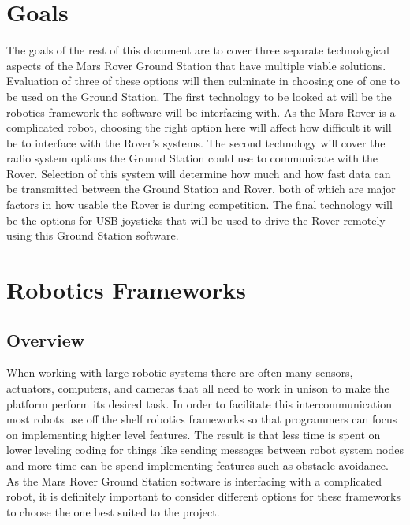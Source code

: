 \documentclass[onecolumn, draftclsnofoot, 10pt, compsoc]{IEEEtran}
\begin{document}
\section{Goals}
The goals of the rest of this document are to cover three separate technological aspects of the Mars Rover Ground Station that have multiple viable solutions. Evaluation of three of these options will then culminate in choosing one of one to be used on the Ground Station.
The first technology to be looked at will be the robotics framework the software will be interfacing with. As the Mars Rover is a complicated robot, choosing the right option here will affect how difficult it will be to interface with the Rover's systems.
The second technology will cover the radio system options the Ground Station could use to communicate with the Rover. Selection of this system will determine how much and how fast data can be transmitted between the Ground Station and Rover, both of which are major factors in how usable the Rover is during competition.
The final technology will be the options for USB joysticks that will be used to drive the Rover remotely using this Ground Station software.

\section{Robotics Frameworks}
\subsection{Overview}
When working with large robotic systems there are often many sensors, actuators, computers, and cameras that all need to work in unison to make the platform perform its desired task.
In order to facilitate this intercommunication most robots use off the shelf robotics frameworks so that programmers can focus on implementing higher level features. The result is that less time is spent on lower leveling coding for things like sending messages between robot system nodes and more time can be spend implementing features such as obstacle avoidance.
As the Mars Rover Ground Station software is interfacing with a complicated robot, it is definitely important to consider different options for these frameworks to choose the one best suited to the project.
\end{document}
